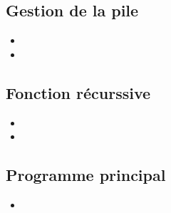 \subsection{Gestion de la pile}
  \begin{itemize}
	\item {}
	\item {}
  \end{itemize}

\subsection{Fonction récurssive}
  \begin{itemize}
    \item {}
    \item {}
  \end{itemize}
\subsection{Programme principal}
  \begin{itemize}
    \item {}
  \end{itemize}
